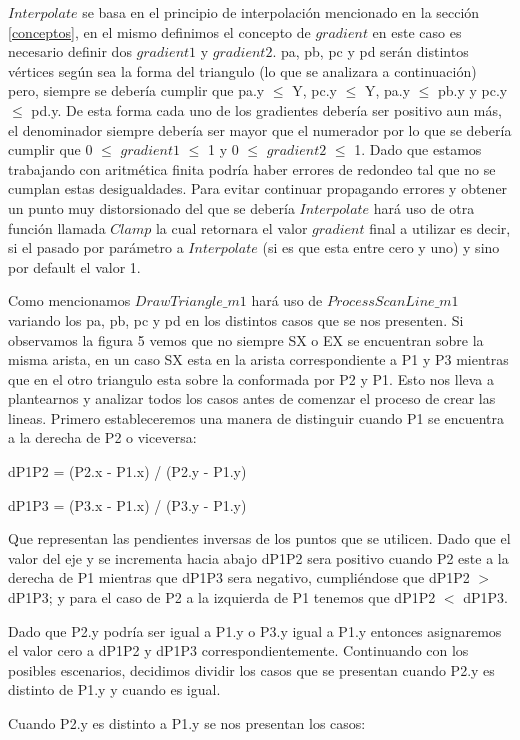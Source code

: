 \documentclass[a4paper]{article}
\begin{document}
$Interpolate$ se basa en el principio de interpolación mencionado en la sección \ref{conceptos}, en el mismo definimos el concepto de $gradient$ en este caso es necesario definir dos $gradient1$ y $gradient2$. pa, pb, pc y pd serán distintos vértices según sea la forma del triangulo (lo que se analizara a continuación) pero, siempre se debería cumplir que pa.y $\leq$ Y, pc.y $\leq$ Y, pa.y $\leq$ pb.y y pc.y $\leq$ pd.y. De esta forma cada uno de los gradientes debería ser positivo aun más, el denominador siempre debería ser mayor que el numerador por lo que se debería cumplir que 0 $\leq$ $gradient1$ $\leq$ 1 y 0 $\leq$ $gradient2$ $\leq$ 1.  Dado que estamos trabajando con aritmética finita podría haber errores de redondeo tal que no se cumplan estas desigualdades. Para evitar continuar propagando errores y obtener un punto muy distorsionado del que se debería $Interpolate$ hará uso de otra función llamada $Clamp$ la cual retornara el valor $gradient$ final a utilizar es decir, si el pasado por parámetro a $Interpolate$ (si es que esta entre cero y uno) y sino por default el valor 1.


Como mencionamos $DrawTriangle\_m1$ hará uso de $ProcessScanLine\_m1$ variando los pa, pb, pc y pd en los distintos casos que se nos presenten. Si observamos la figura 5 vemos que no siempre SX o EX se encuentran sobre la misma arista, en un caso SX esta en la arista correspondiente a P1 y P3 mientras que en el otro triangulo esta sobre la conformada por P2 y P1. Esto nos lleva a plantearnos y analizar todos los casos antes de comenzar el proceso de crear las lineas.
Primero estableceremos una manera de distinguir cuando P1 se encuentra a la derecha de P2 o viceversa: 

dP1P2 = (P2.x - P1.x) / (P2.y - P1.y) 

dP1P3 = (P3.x - P1.x) / (P3.y - P1.y)\newline

Que representan las pendientes inversas de los puntos que se utilicen. Dado que el valor del eje y se incrementa hacia abajo dP1P2 sera positivo cuando P2 este a la derecha de P1 mientras que dP1P3 sera negativo, cumpliéndose que dP1P2 $>$ dP1P3; y para el caso de P2 a la izquierda de P1 tenemos que dP1P2 $<$ dP1P3. 
\par Dado que P2.y podría ser igual a P1.y o P3.y igual a P1.y entonces asignaremos el valor cero a dP1P2 y dP1P3 correspondientemente.
Continuando con los posibles escenarios, decidimos dividir los casos que se presentan cuando P2.y es distinto de P1.y y cuando es igual.\newline
\par Cuando P2.y es distinto a P1.y se nos presentan los casos:
 
\end{document}

